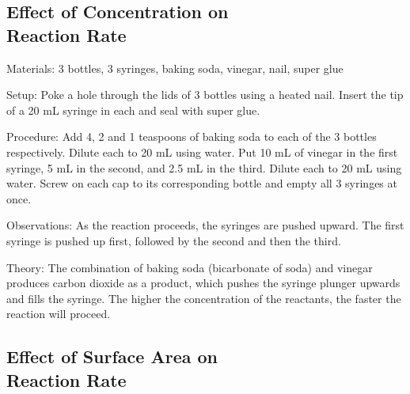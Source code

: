 \begin{multicols}{2}
\subsection[Effect of Concentration on Reaction Rate]{Effect of Concentration on \hfill \\ Reaction Rate}  %


\begin{description*}
\item[Materials:]{3 bottles, 3 syringes, baking soda, vinegar, nail, super glue}
\item[Setup:]{Poke a hole through the lids of 3 bottles using a heated nail. Insert the tip of a 20 mL syringe in each and seal with super glue.}
\item[Procedure:]{Add 4, 2 and 1 teaspoons of baking soda to each of the 3 bottles respectively. Dilute each to 20 mL using water. Put 10 mL of vinegar in the first syringe, 5 mL in the second, and 2.5 mL in the third. Dilute each to 20 mL using water. Screw on each cap to its corresponding bottle and empty all 3 syringes at once.}
\item[Observations:]{As the reaction proceeds, the syringes are pushed upward. The first syringe is pushed up first, followed by the second and then the third.}
\item[Theory:]{The combination of baking soda (bicarbonate of soda) and vinegar produces carbon dioxide as a product, which pushes the syringe plunger upwards and fills the syringe. The higher the concentration of the reactants, the faster the reaction will proceed.}
\end{description*}

\columnbreak

\subsection[Effect of Surface Area on Reaction Rate]{Effect of Surface Area on \hfill \\ Reaction Rate} 


\end{multicols}
